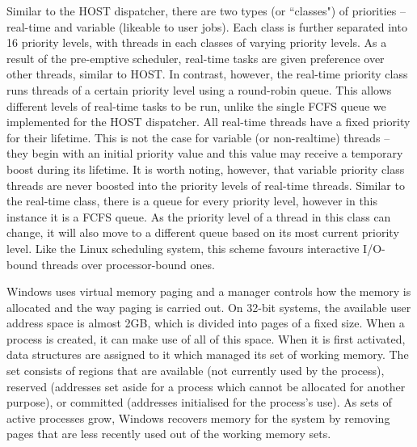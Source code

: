 \documentclass[12pt]{article}
\begin{document}
Similar to the HOST dispatcher, there are two types (or ``classes") of
priorities -- real-time and variable (likeable to user jobs). Each class is
further separated into 16 priority levels, with threads in each classes of 
varying priority levels. As a result of the pre-emptive scheduler, real-time
tasks are given preference over other threads, similar to HOST. In contrast,
however, the real-time priority class runs threads of a certain priority level
using a round-robin queue. This allows different levels of real-time tasks to
be run, unlike the single FCFS queue we implemented for the HOST dispatcher.
All real-time threads have a fixed priority for their lifetime. This is not
the case for variable (or non-realtime) threads -- they begin with an initial
priority value and this value may receive a temporary boost during its
lifetime. It is worth noting, however, that variable priority class threads are
never boosted into the priority levels of real-time threads.
Similar to the real-time class, there is a queue for every priority
level, however in this instance it is a FCFS queue. As the priority level of a
thread in this class can change, it will also move to a different queue based
on its most current priority level. Like the Linux scheduling system, this
scheme favours interactive I/O-bound threads over processor-bound ones.

Windows uses virtual memory paging and a manager controls how the memory is
allocated and the way paging is carried out. On 32-bit systems, the available
user address space is almost 2GB, which is divided into pages of a fixed size.
When a process is created, it can make use of all of this space. When it is
first activated, data structures are assigned to it which managed its set of
working memory. The set consists of regions that are available (not currently
used by the process), reserved (addresses set aside for a process which cannot
be allocated for another purpose), or committed (addresses initialised for the
process's use). As sets of active processes grow, Windows recovers memory for
the system by removing pages that are less recently used out of the working
memory sets.



\end{document}
